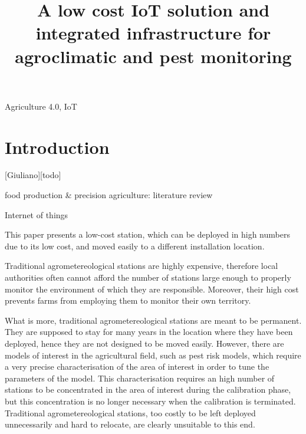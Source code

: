 \documentclass[authoryear,preprint,review,12pt]{elsarticle}
\title{A low cost IoT solution and integrated infrastructure for agroclimatic and pest monitoring}
\begin{document}
\maketitle

\begin{abstract}
\end{abstract}

\begin{keyword}
    Agriculture 4.0, IoT
\end{keyword}

\tableofcontents
\linenumbers

\section{Introduction}[Giuliano][todo]

food production & precision agriculture: literature review

Internet of things 

This paper presents a low-cost station, which can be deployed in high numbers due to its low cost, and moved easily to a different installation location.

Traditional agrometereological stations are highly expensive, therefore local authorities often cannot afford the number of stations large enough to properly monitor the environment of which they are responsible. Moreover, their high cost prevents farms from employing them to monitor their own territory.

What is more, traditional agrometereological stations are meant to be permanent. They are supposed to stay for many years in the location where they have been deployed, hence they are not designed to be moved easily. However, there are models of interest in the agricultural field, such as pest risk models, which require a very precise characterisation of the area of interest in order to tune the parameters of the model.
This characterisation requires an high number of stations to be concentrated in the area of interest during the calibration phase, but this concentration is no longer necessary when the calibration is terminated.
Traditional agrometereological stations, too costly to be left deployed unnecessarily and hard to relocate, are clearly unsuitable to this end.
\end{document}

